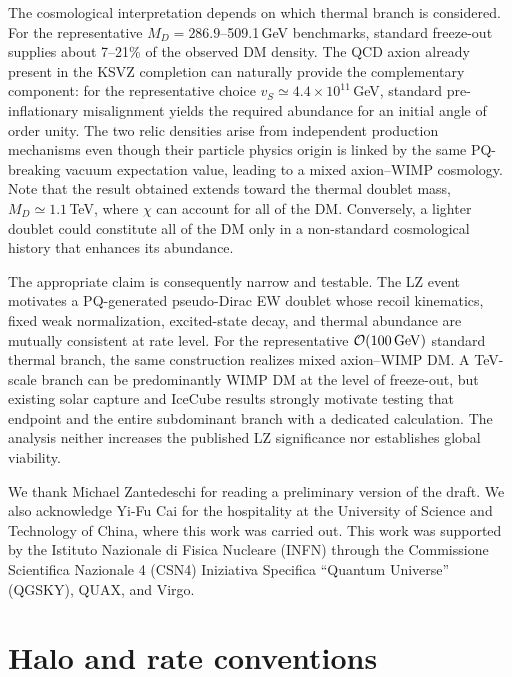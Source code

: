 \documentclass[aps,prd,reprint,preprintnumbers,superscriptaddress,nofootinbib,floatfix]{revtex4-2}
\begin{document}
The cosmological interpretation depends on which thermal branch is considered. For the representative $M_D=286.9$--509.1\,GeV benchmarks, standard freeze-out supplies about 7--21\% of the observed DM density. The QCD axion already present in the KSVZ completion can naturally provide the complementary component: for the representative choice $v_S\simeq4.4\times10^{11}$\,GeV, standard pre-inflationary misalignment yields the required abundance for an initial angle of order unity. The two relic densities arise from independent production mechanisms even though their particle physics origin is linked by the same PQ-breaking vacuum expectation value, leading to a mixed axion--WIMP cosmology. Note that the result obtained extends toward the thermal doublet mass, $M_D\simeq1.1$\,TeV, where $\chi$ can account for all of the DM. Conversely, a lighter doublet could constitute all of the DM only in a non-standard cosmological history that enhances its abundance.

The appropriate claim is consequently narrow and testable. The LZ event motivates a PQ-generated pseudo-Dirac EW doublet whose recoil kinematics, fixed weak normalization, excited-state decay, and thermal abundance are mutually consistent at rate level. For the representative $\mathcal{O}(100{\rm\,GeV})$ standard thermal branch, the same construction realizes mixed axion--WIMP DM. A TeV-scale branch can be predominantly WIMP DM at the level of freeze-out, but existing solar capture and IceCube results strongly motivate testing that endpoint and the entire subdominant branch with a dedicated calculation. The analysis neither increases the published LZ significance nor establishes global viability.

\begin{acknowledgments}
We thank Michael Zantedeschi for reading a preliminary version of the draft. We also acknowledge Yi-Fu Cai for the hospitality at the University of Science and Technology of China, where this work was carried out. This work was supported by the Istituto Nazionale di Fisica Nucleare (INFN) through the Commissione Scientifica Nazionale 4 (CSN4) Iniziativa Specifica ``Quantum Universe'' (QGSKY), QUAX, and Virgo.
\end{acknowledgments}

\appendix

\section{Halo and rate conventions}
\label{app:rate}
\end{document}
